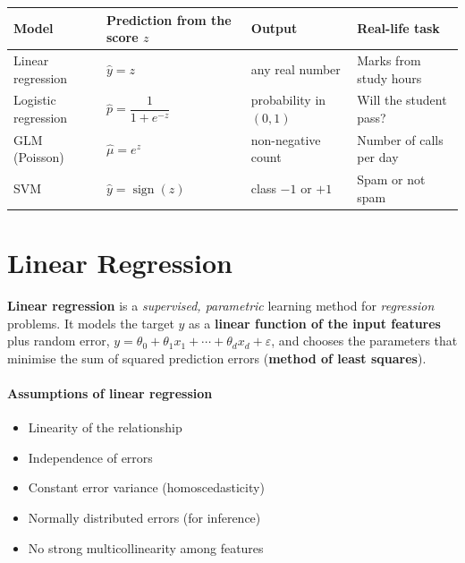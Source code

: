 \begin{center}\small
\begin{tabular}{@{}llll@{}}
\toprule
\textbf{Model} & \textbf{Prediction from the score $z$} & \textbf{Output} & \textbf{Real-life task}\\
\midrule
Linear regression & $\hat y=z$ & any real number & Marks from study hours\\
Logistic regression & $\hat p=\dfrac1{1+e^{-z}}$ & probability in $(0,1)$ & Will the student pass?\\
GLM (Poisson) & $\hat\mu=e^{z}$ & non-negative count & Number of calls per day\\
SVM & $\hat y=\operatorname{sign}(z)$ & class $-1$ or $+1$ & Spam or not spam\\
\bottomrule
\end{tabular}
\end{center}

\section{Linear Regression}


\begin{definition}
\textbf{Linear regression} is a \emph{supervised, parametric} learning method for \emph{regression} problems. It models the target $y$ as a \textbf{linear function of the input features} plus random error, $y=\theta_0+\theta_1x_1+\cdots+\theta_dx_d+\varepsilon$, and chooses the parameters that minimise the sum of squared prediction errors (\textbf{method of least squares}).
\end{definition}



\paragraph{Assumptions of linear regression}
\begin{itemize}
  \item Linearity of the relationship
  \item Independence of errors
  \item Constant error variance (homoscedasticity)
  \item Normally distributed errors (for inference)
  \item No strong multicollinearity among features
\end{itemize}

